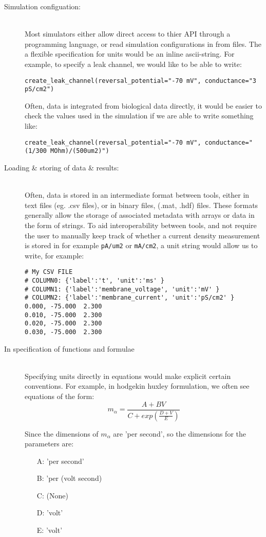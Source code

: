 \documentclass{article}
\begin{document}
\begin{description}
\item[Simulation configuation:] \hfill \\
Most simulators either allow direct access to thier API through a programming language, or read simulation configurations in from files. The a flexible specification for units would be an inline ascii-string.  For example, to specify a leak channel, we would like to be able to write:
\begin{lstlisting}
create_leak_channel(reversal_potential="-70 mV", conductance="3 pS/cm2")
\end{lstlisting}
Often, data is integrated from biological data directly, it would be easier to
check the values used in the simulation if we are able to write something like:
\begin{lstlisting}
create_leak_channel(reversal_potential="-70 mV", conductance="(1/300 MOhm)/(500um2)")
\end{lstlisting}


\item[Loading \& storing of data \& results:]  \hfill \\


Often, data is stored in an intermediate format between tools, either in text files (eg. .csv files), or in binary files, (.mat, .hdf) files. These formats generally allow the storage of associated metadata with arrays or data in the form of strings. To aid interoperability between tools, and not require the user to manually keep track of whether a current density measurement is stored in for example \verb|pA/um2| or \verb|mA/cm2|, a unit string would allow us to write, for example:

\begin{verbatim}
# My CSV FILE
# COLUMN0: {'label':'t', 'unit':'ms' }
# COLUMN1: {'label':'membrane_voltage', 'unit':'mV' }
# COLUMN2: {'label':'membrane_current', 'unit':'pS/cm2' }
0.000, -75.000  2.300
0.010, -75.000  2.300
0.020, -75.000  2.300
0.030, -75.000  2.300
\end{verbatim}


\item[In specification of functions and formulae] \hfill \\
Specifying units directly in equations would make explicit certain conventions.
For example, in hodgekin huxley formulation, we often see equations of the form:
$$
m_\alpha = \frac{A + BV}{C + exp( \frac{D+V}{E}) }
$$

Since the dimensions of $m_\alpha$ are 'per second', so the dimensions for the parameters are:
\begin{itemize}
\item[A:]  'per second'
\item[B:]  'per (volt second) 
\item[C:]  (None)
\item[D:]  'volt'
\item[E:]  'volt'
\end{itemize}


\end{description}
\end{document}
